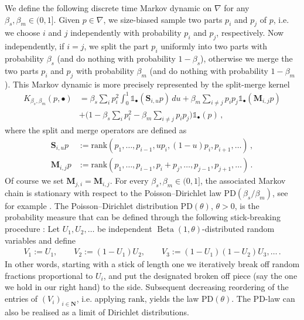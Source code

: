 \documentclass[a4paper,11pt]{article}
\newcommand{\NN}{\mathbf{N}}
\numberwithin{equation}{section}
\begin{document}
We define the following discrete time Markov dynamic on $ \nabla $ for any $ \beta_{s}, \beta_{m} \in (0,1] $. 
Given $ p \in \nabla $, we size-biased sample two parts $ p_{i} $ and $ p_{j} $ of $ p $, i.e. we choose $ i $ and $ j $ independently with probability $ p_{i} $ and $ p_{j} $, respectively. 
Now independently, if $ i = j $, we split the part $ p_{i} $ uniformly into two parts with probability $ \beta_{s} $ (and do nothing with probability $1 - \beta_{s} $), otherwise we merge the two parts $ p_{i} $ and $ p_{j} $ with probability $ \beta_{m} $ (and do nothing with probability $1 - \beta_{m} $). 
This Markov dynamic is more precisely represented by the 
 split-merge kernel
\begin{equation*}
\begin{aligned}
K_{\beta_{s}, \beta_{m}}(p, \bullet) 
&= 
\beta_{s}\sum_{i} p_{i}^{2}  \int_{0}^{1} \mathds{1}_{\bullet}(\mathbf{S}_{i,u }p) \, du 
+ \beta_{m}\sum_{i \neq j} p_{i} p_{j}  \mathds{1}_{\bullet}(\mathbf{M}_{i,j}p) \\
&+
\bigg( 1- \beta_{s} \sum_{i} p_{i}^{2}- \beta_{m}\sum_{i \neq j} p_{i} p_{j} \bigg)\mathds{1}_{\bullet}(p)\,,
\end{aligned}
\end{equation*}
where the split and merge operators are defined as
\begin{equation*}
\begin{aligned}
\mathbf{S}_{i,u }p&:= \mathrm{rank}(p_{1}, \ldots, p_{i-1},u  p_{i}, (1-u)p_{i}, p_{i+1}, \ldots)\,,
\\
\mathbf{M}_{i,j}p&:=\mathrm{rank}(p_{1}, \ldots, p_{i-1}, p_{i}+ p_{j}, \ldots, p_{j-1}, p_{j+1}, \ldots)\,.
\end{aligned}
\end{equation*}
 Of course we set $\mathbf M_{j,i}=\mathbf M_{i,j}$.
For every $ \beta_{s}, \beta _{m} \in (0,1]$, the associated Markov chain is stationary with respect to the Poisson--Dirichlet law $ \mathrm{PD} ( \beta_{s}/ \beta_{m})$, see for example \cite{MWZZ2002}. The Poisson--Dirichlet distribution $\mathrm{PD}( \theta )$, $\theta >0 $, is the probability measure that can be defined through the following stick-breaking procedure \cite{Fen10}: Let $U_1,U_2,\ldots$ be independent
$\operatorname{Beta}(1,\theta)$-distributed random variables and define
\begin{equation*}
\begin{aligned}
V_1 := U_1,\qquad
    V_2 := (1-U_1)U_2,\qquad
    V_3 := (1-U_1)(1-U_2)U_3,\ldots\,.
\end{aligned}
\end{equation*}
In other words, starting with a stick of length one we iteratively break off random fractions proportional to $ U_{i}$, and put the designated broken off piece (say the one we hold in our right hand) to the side. Subsequent decreasing reordering of the entries of $ ( V_{i})_{i \in \NN}$, i.e. applying $ \mathrm{rank}$, yields the law $\mathrm{PD}( \theta )$.
The PD-law can also be realised as a limit of Dirichlet distributions. 
\end{document}
